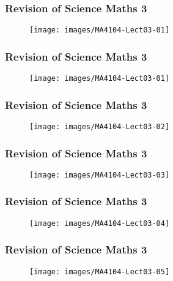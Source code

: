 \documentclass{beamer}
\begin{document}
	\begin{frame}
		\frametitle{Revision of Science Maths 3}
		\begin{figure}
			\centering
			\texttt{[image: images/MA4104-Lect03-01]}
			\caption{}
			\label{fig:MA4104-Lect03-01}
		\end{figure}
	\end{frame}
	\begin{frame}
		\frametitle{Revision of Science Maths 3}
		\begin{figure}
			\centering
			\texttt{[image: images/MA4104-Lect03-01]}
		\end{figure}
	\end{frame}
	\begin{frame}
		\frametitle{Revision of Science Maths 3}
		\begin{figure}
			\centering
			\texttt{[image: images/MA4104-Lect03-02]}
		\end{figure}
	\end{frame}
	\begin{frame}
		\frametitle{Revision of Science Maths 3}
		\begin{figure}
			\centering
			\texttt{[image: images/MA4104-Lect03-03]}
			
		\end{figure}
	\end{frame}
	\begin{frame}
		\frametitle{Revision of Science Maths 3}
		\begin{figure}
			\centering
			\texttt{[image: images/MA4104-Lect03-04]}
			
		\end{figure}
	\end{frame}
	\begin{frame}
		\frametitle{Revision of Science Maths 3}
		\begin{figure}
			\centering	
			\texttt{[image: images/MA4104-Lect03-05]}
			
		\end{figure}
	\end{frame}
\end{document}
